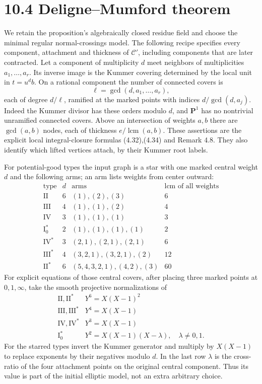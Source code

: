 \documentclass[11pt]{article}
\let\chapterexercise\exercise
\renewcommand{\exercise}[2]{\Needspace{8\baselineskip}\chapterexercise{#1}{#2}}
\begin{document}
\section*{10.4 Deligne--Mumford theorem}

\pf We retain the proposition's algebraically closed residue field and choose the minimal regular normal-crossings model. The following recipe specifies every component, attachment and thickness of $\mathcal C'$, including components that are later contracted. Let a component of multiplicity $d$ meet neighbors of multiplicities $a_1,\ldots,a_r$. Its inverse image is the Kummer covering determined by the local unit in $t=u^d b$. On a rational component the number of connected covers is
\[ \ell=\gcd(d,a_1,\ldots,a_r), \]
each of degree $d/\ell$, ramified at the marked points with indices $d/\gcd(d,a_j)$. Indeed the Kummer divisor has these orders modulo $d$, and $\mathbf P^1$ has no nontrivial unramified connected covers. Above an intersection of weights $a,b$ there are $\gcd(a,b)$ nodes, each of thickness $e/\operatorname{lcm}(a,b)$. These assertions are the explicit local integral-closure formulas (4.32),(4.34) and Remark 4.8. They also identify which lifted vertices attach, by their Kummer root labels.

For potential-good types the input graph is a star with one marked central weight $d$ and the following arms; an arm lists weights from center outward:
\[
\begin{array}{c|c|l|c}
\text{type}&d&\text{arms}&\operatorname{lcm}\text{ of all weights}\\ \hline
\mathrm{II}&6&(1),(2),(3)&6\\
\mathrm{III}&4&(1),(1),(2)&4\\
\mathrm{IV}&3&(1),(1),(1)&3\\
\mathrm I_0^*&2&(1),(1),(1),(1)&2\\
\mathrm{IV}^*&3&(2,1),(2,1),(2,1)&6\\
\mathrm{III}^*&4&(3,2,1),(3,2,1),(2)&12\\
\mathrm{II}^*&6&(5,4,3,2,1),(4,2),(3)&60
\end{array}
\]
For explicit equations of those central covers, after placing three marked points at $0,1,\infty$, take the smooth projective normalizations of
\[
\begin{array}{c|l}
\mathrm{II},\mathrm{II}^*&Y^6=X(X-1)^2\\
\mathrm{III},\mathrm{III}^*&Y^4=X(X-1)\\
\mathrm{IV},\mathrm{IV}^*&Y^3=X(X-1)\\
\mathrm I_0^*&Y^2=X(X-1)(X-\lambda),\quad\lambda\ne0,1.
\end{array}
\]
For the starred types invert the Kummer generator and multiply by $X(X-1)$ to replace exponents by their negatives modulo $d$. In the last row $\lambda$ is the cross-ratio of the four attachment points on the original central component. Thus its value is part of the initial elliptic model, not an extra arbitrary choice.
\end{document}
